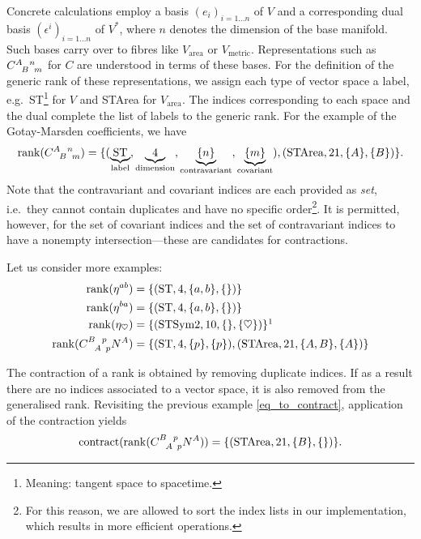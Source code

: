 Concrete calculations employ a basis $(e_i)_{i=1\dots n}$ of $V$ and a corresponding dual basis $(\epsilon^i)_{i=1\dots n}$ of $V^\ast$, where $n$ denotes the dimension of the base manifold. Such bases carry over to fibres like $V_\text{area}$ or $V_\text{metric}$. Representations such as $\gmc{A}{B}{n}{m}$ for $C$ are understood in terms of these bases. For the definition of the generic rank of these representations, we assign each type of vector space a label, e.g.\ ST\footnote{Meaning: tangent space to spacetime.} for $V$ and STArea for $V_\text{area}$. The indices corresponding to each space and the dual complete the list of labels to the generic rank. For the example of the Gotay-Marsden coefficients, we have
\begin{equation}
  \operatorname{rank}(\gmc{A}{B}{n}{m}) = \{(\underbrace{\text{ST}}_{\text{label}}, \underbrace{4}_{\text{dimension}}, \underbrace{\{n\}}_{\text{contravariant}}, \underbrace{\{m\}}_{\text{covariant}}), (\text{STArea}, 21, \{A\}, \{B\})\}.
\end{equation}
Note that the contravariant and covariant indices are each provided as \emph{set}, i.e.\ they cannot contain duplicates and have no specific order\footnote{For this reason, we are allowed to sort the index lists in our implementation, which results in more efficient operations.}. It is permitted, however, for the set of covariant indices and the set of contravariant indices to have a nonempty intersection---these are candidates for contractions.

Let us consider more examples:
\begin{align}
  \operatorname{rank}(\eta^{ab}) = {} & \{(\text{ST}, 4, \{a,b\}, \{\})\} \\
  \operatorname{rank}(\eta^{ba}) = {} & \{(\text{ST}, 4, \{a,b\}, \{\})\} \\
  \operatorname{rank}(\eta_{\heartsuit}) = {} & \{(\text{STSym2}, 10, \{\}, \{\heartsuit\})\}\footnotemark \\
  \operatorname{rank}(\gmc{B}{A}{p}{p} N^A) = {} & \{(\text{ST}, 4, \{p\}, \{p\}), (\text{STArea}, 21, \{A,B\}, \{A\})\} \label{eq_to_contract}
\end{align}

The contraction of a rank is obtained by removing duplicate indices. If as a result there are no indices associated to a vector space, it is also removed from the generalised rank. Revisiting the previous example \eqref{eq_to_contract}, application of the contraction yields
\begin{equation}
  \operatorname{contract}(\operatorname{rank}(\gmc{B}{A}{p}{p} N^A)) = \{(\text{STArea}, 21, \{B\}, \{\})\}.
\end{equation}

